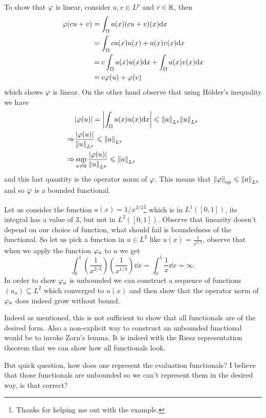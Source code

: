 \documentclass[12pt]{memoir}
\begin{document}
\begin{ptcbr}
  To show that $\varphi$ is linear, consider $u,v\in L^p$ and $c\in\mathbb{R}$, then 
  \begin{align*}
  \varphi(cu+v)&=\int_\Omega a(x)(cu+v)(x)\dd x\\
  &=\int_\Omega ca(x)u(x)+a(x)v(x)\dd x\\
  &=c\int_\Omega a(x)u(x)\dd x+\int_\Omega a(x)v(x)\dd x\\
  &=c\varphi(u)+\varphi(v)
  \end{align*}
  which shows $\varphi$ is linear. On the other hand observe that using H\"older's inequality we have 
\begin{align*}
  &|\varphi(u)|=\left|\int_\Omega a(x)u(x)\dd x\right|\leqslant\norm{a}_{L^q}\norm{u}_{L^p}\\
  \Rightarrow& \frac{|\varphi(u)|}{\norm{u}_{L^p}}\leqslant\norm{a}_{L^q}\\
  \Rightarrow&\sup_{u\neq 0}\frac{|\varphi(u)|}{\norm{u}_{L^p}}\leqslant\norm{a}_{L^q}
\end{align*}
  and this last quantity is the operator norm of $\varphi$. This means that $\norm{\varphi}_{\text{op}}\leqslant\norm{a}_{L^q}$ and so $\varphi$ is a bounded functional.\par
  Let us consider the function $a(x)=1/x^{2/3}$\footnote{Thanks for helping me out with the example.} which is in $L^1([0,1])$, its integral has a value of $3$, but not in $L^2([0,1])$. Observe that linearity doesn't depend on our choice of function, what should fail is boundedness of the functional. So let us pick a function in $u\in L^2$ like $u(x)=\frac{1}{x^{1/3}}$, observe that when we apply the function $\varphi_a$ to $u$ we get 
  $$\int_{0}^{1}\left(\frac{1}{x^{2/3}}\right)\left(\frac{1}{x^{1/3}}\right)\dd x=\int_{0}^{1}\frac{1}{x}\dd x=\infty.$$ 
  In order to show $\varphi_a$ is unbounded we can construct a sequence of functions $(u_n)\subseteq L^2$ which converged to $u(x)$ and then show that the operator norm of $\varphi_a$ does indeed grow without bound.
\end{ptcbr}

Indeed as mentioned, this is not sufficient to show that all functionals are of the desired form. Also a non-explicit way to construct an unbounded functional would be to invoke Zorn's lemma. It is indeed with the Riesz representation theorem that we can show how all functionals look.\par 
But quick question, how does one represent the evaluation functionals? I believe that those functionals are unbounded so we can't represent them in the desired way, is that correct?
\end{document}
